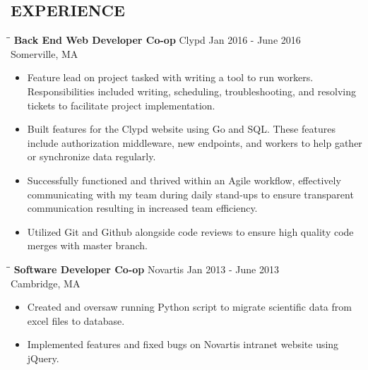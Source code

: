 \documentclass{res}
\begin{document}
 

\address{\bf  1611 W. Division st. Apt 1106 \\Chicago, IL 60622 \\(857) 407-8840 \\ ronbrz@protonmail.ch}

\begin{resume}
\section{EXPERIENCE}
   \vspace{-0.1in}
   \begin{tabbing}
   \hspace{2.3in}\= \hspace{2.6in}\= \kill %
   {\bf Back End Web Developer Co-op} \>Clypd     \> Jan 2016 - June 2016\\
   \>Somerville, MA
   \end{tabbing}
   \begin{itemize} \itemsep -2pt
   \item Feature lead on project tasked with writing a tool to run workers. Responsibilities
     included writing, scheduling, troubleshooting, and resolving tickets to facilitate project
     implementation.
   \item Built features for the Clypd website using Go and SQL. These features include
     authorization middleware, new endpoints, and workers to help gather or synchronize data
     regularly.
   \item Successfully functioned and thrived within an Agile workflow, effectively communicating
     with my team during daily stand-ups to ensure transparent communication resulting in
     increased team efficiency. 
   \item Utilized Git and Github alongside code reviews to ensure high quality code merges with
     master branch.
   \end{itemize}

   \begin{tabbing}
   \hspace{2.3in}\= \hspace{2.6in}\= \kill %
    {\bf Software Developer Co-op} \>Novartis \> Jan 2013 - June 2013\\
    \>Cambridge, MA
   \end{tabbing}%
   \begin{itemize} \itemsep -2pt
   \item Created and oversaw running Python script to migrate scientific data from excel files
     to database.
   \item Implemented features and fixed bugs on Novartis intranet website using jQuery.
   \end{itemize}
\vspace{-.1in}

\end{resume}
\end{document}
